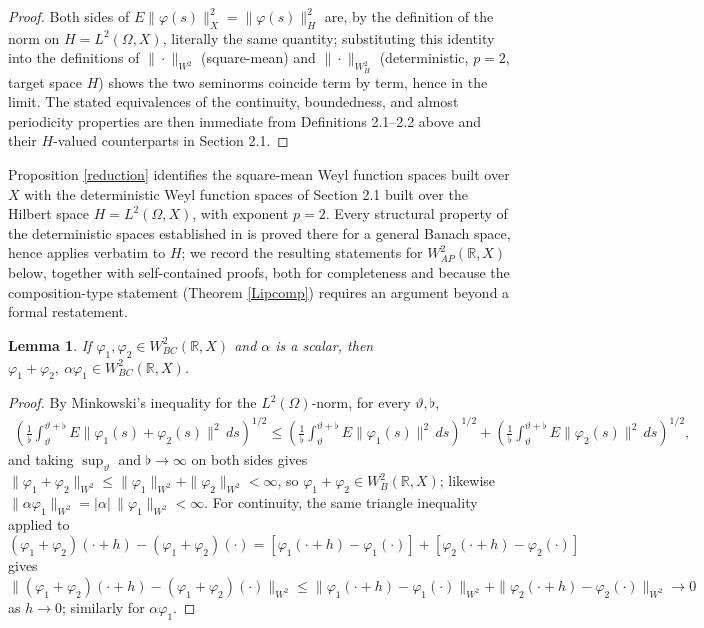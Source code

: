 \documentclass[11pt]{amsart}
\newtheorem{lemma}[theorem]{Lemma}
\begin{document}
\begin{proof}
Both sides of $E\|\varphi(s)\|_X^2=\|\varphi(s)\|_H^2$ are, by the definition of the norm on $H=L^2(\Omega,X)$, literally the same quantity; substituting this identity into the definitions of $\|\cdot\|_{W^2}$ (square-mean) and $\|\cdot\|_{W^2_H}$ (deterministic, $p=2$, target space $H$) shows the two seminorms coincide term by term, hence in the limit. The stated equivalences of the continuity, boundedness, and almost periodicity properties are then immediate from Definitions 2.1--2.2 above and their $H$-valued counterparts in Section 2.1.
\end{proof}

Proposition \ref{reduction} identifies the square-mean Weyl function spaces built over $X$ with the deterministic Weyl function spaces of Section 2.1 built over the Hilbert space $H=L^2(\Omega,X)$, with exponent $p=2$. Every structural property of the deterministic spaces established in \cite[Section 2]{LiWeyl} is proved there for a general Banach space, hence applies verbatim to $H$; we record the resulting statements for $W^2_{AP}(\mathbb R,X)$ below, together with self-contained proofs, both for completeness and because the composition-type statement (Theorem \ref{Lipcomp}) requires an argument beyond a formal restatement.

\begin{lemma}\label{BClinear}
If $\varphi_1,\varphi_2\in W^2_{BC}(\mathbb R,X)$ and $\alpha$ is a scalar, then $\varphi_1+\varphi_2,\ \alpha\varphi_1\in W^2_{BC}(\mathbb R,X)$.
\end{lemma}

\begin{proof}
By Minkowski's inequality for the $L^2(\Omega)$-norm, for every $\vartheta,\flat$,
\begin{align*}
\left(\frac1\flat\int_\vartheta^{\vartheta+\flat}E\|\varphi_1(s)+\varphi_2(s)\|^2\,ds\right)^{1/2}\le\left(\frac1\flat\int_\vartheta^{\vartheta+\flat}E\|\varphi_1(s)\|^2\,ds\right)^{1/2}+\left(\frac1\flat\int_\vartheta^{\vartheta+\flat}E\|\varphi_2(s)\|^2\,ds\right)^{1/2},
\end{align*}
and taking $\sup_\vartheta$ and $\flat\to\infty$ on both sides gives $\|\varphi_1+\varphi_2\|_{W^2}\le\|\varphi_1\|_{W^2}+\|\varphi_2\|_{W^2}<\infty$, so $\varphi_1+\varphi_2\in W^2_B(\mathbb R,X)$; likewise $\|\alpha\varphi_1\|_{W^2}=|\alpha|\,\|\varphi_1\|_{W^2}<\infty$. For continuity, the same triangle inequality applied to $(\varphi_1+\varphi_2)(\cdot+h)-(\varphi_1+\varphi_2)(\cdot)=[\varphi_1(\cdot+h)-\varphi_1(\cdot)]+[\varphi_2(\cdot+h)-\varphi_2(\cdot)]$ gives $\|(\varphi_1+\varphi_2)(\cdot+h)-(\varphi_1+\varphi_2)(\cdot)\|_{W^2}\le\|\varphi_1(\cdot+h)-\varphi_1(\cdot)\|_{W^2}+\|\varphi_2(\cdot+h)-\varphi_2(\cdot)\|_{W^2}\to0$ as $h\to0$; similarly for $\alpha\varphi_1$.
\end{proof}
\end{document}
